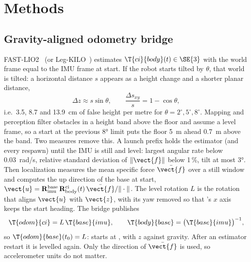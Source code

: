 \section{Methods}
\label{sec:methods}

\subsection{Gravity-aligned odometry bridge}
\label{sec:bridge}

FAST-LIO2~\cite{xu2022fastlio2} (or Leg-KILO~\cite{ou2024legkilo}) estimates
$\T{ci}{body}(t) \in \SE{3}$ with the world frame  equal to the IMU frame at
start. If the robot starts tilted by $\theta$, that world is tilted: a horizontal distance $s$
appears as a height change and a shorter planar distance,
\begin{equation}
  \Delta z \approx s \sin\theta, \qquad \frac{\Delta s_{xy}}{s} = 1 - \cos\theta ,
  \label{eq:tilt}
\end{equation}
i.e.\ 3.5, 8.7 and 13.9~cm of false height per metre for $\theta = 2^\circ, 5^\circ,
8^\circ$. Mapping and perception filter obstacles in a height band above the floor and
assume a level frame, so a start at the previous 8° limit puts the floor 5~m ahead 0.7~m above
the band. Two measures remove this. A launch prefix holds the estimator (and every respawn)
until the IMU is still and level: largest angular rate below 0.03~rad/s, relative standard
deviation of $\|\vect{f}\|$ below 1\,\%, tilt at most 3°. Then localization measures the mean
specific force $\bar{\vect{f}}$ over a still window and computes the up direction of the base at
start, $\vect{u} = \mathbf{R}^{\mathrm{base}}_{\mathrm{imu}}\, \mathbf{R}^{\mathrm{ci}}_{
\mathrm{body}}(t)\, \bar{\vect{f}} / \|\cdot\|$. The level rotation $L$ is the rotation that
aligns $\vect{u}$ with $\vect{z}$, with its yaw removed so that 's $x$ axis keeps the
start heading. The bridge publishes
\begin{equation}
  \T{odom}{ci} = L\, \T{base}{imu}, \qquad \T{body}{base} = \big(\T{base}{imu}\big)^{-1},
\end{equation}
so $\T{odom}{base}(t_0) = L$:  starts at , with $z$ against gravity.
After an estimator restart it is levelled again. Only the direction of $\bar{\vect{f}}$ is used,
so accelerometer units do not matter.

